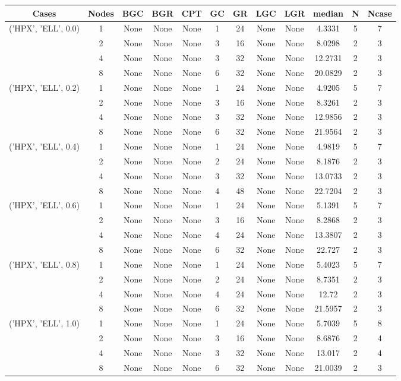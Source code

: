 \begin{tabular}{cccccccccccc}
\hline
Cases & Nodes& BGC& BGR& CPT& GC& GR& LGC& LGR& median & N & Ncase \\
\hline
\multirow{4}{*}{('HPX', 'ELL', 0.0)}& 1& None& None& None& 1& 24& None& None& 4.3331& 5& 7\\
& 2& None& None& None& 3& 16& None& None& 8.0298& 2& 3\\
& 4& None& None& None& 3& 32& None& None& 12.2731& 2& 3\\
& 8& None& None& None& 6& 32& None& None& 20.0829& 2& 3\\
\hline
\multirow{4}{*}{('HPX', 'ELL', 0.2)}& 1& None& None& None& 1& 24& None& None& 4.9205& 5& 7\\
& 2& None& None& None& 3& 16& None& None& 8.3261& 2& 3\\
& 4& None& None& None& 3& 32& None& None& 12.9856& 2& 3\\
& 8& None& None& None& 6& 32& None& None& 21.9564& 2& 3\\
\hline
\multirow{4}{*}{('HPX', 'ELL', 0.4)}& 1& None& None& None& 1& 24& None& None& 4.9819& 5& 7\\
& 2& None& None& None& 2& 24& None& None& 8.1876& 2& 3\\
& 4& None& None& None& 3& 32& None& None& 13.0733& 2& 3\\
& 8& None& None& None& 4& 48& None& None& 22.7204& 2& 3\\
\hline
\multirow{4}{*}{('HPX', 'ELL', 0.6)}& 1& None& None& None& 1& 24& None& None& 5.1391& 5& 7\\
& 2& None& None& None& 3& 16& None& None& 8.2868& 2& 3\\
& 4& None& None& None& 4& 24& None& None& 13.3807& 2& 3\\
& 8& None& None& None& 6& 32& None& None& 22.727& 2& 3\\
\hline
\multirow{4}{*}{('HPX', 'ELL', 0.8)}& 1& None& None& None& 1& 24& None& None& 5.4023& 5& 7\\
& 2& None& None& None& 2& 24& None& None& 8.7351& 2& 3\\
& 4& None& None& None& 4& 24& None& None& 12.72& 2& 3\\
& 8& None& None& None& 6& 32& None& None& 21.5957& 2& 3\\
\hline
\multirow{4}{*}{('HPX', 'ELL', 1.0)}& 1& None& None& None& 1& 24& None& None& 5.7039& 5& 8\\
& 2& None& None& None& 3& 16& None& None& 8.6876& 2& 4\\
& 4& None& None& None& 3& 32& None& None& 13.017& 2& 4\\
& 8& None& None& None& 6& 32& None& None& 21.0039& 2& 3\\
\hline
\end{tabular}
